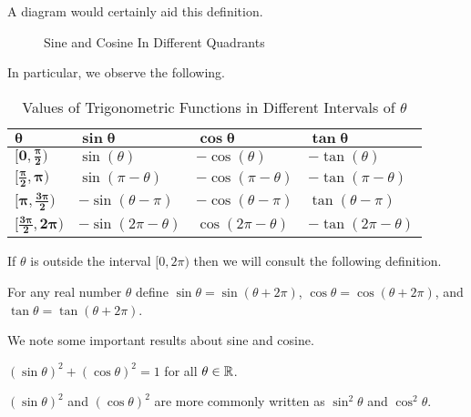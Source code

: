 A diagram would certainly aid this definition.

\begin{figure}[H]
    \centering
    \caption{Sine and Cosine In Different Quadrants}
\end{figure}

In particular, we observe the following.
\begin{table}[H]
    \centering
    \begin{tabular}{|l|l|l|l|}
        \hline
        $\boldsymbol{\theta}$ & $\boldsymbol{\sin\theta}$ & $\boldsymbol{\cos\theta}$ & $\boldsymbol{\tan\theta}$ \\ \hline
        $\boldsymbol{[0,\frac\pi2)}$ & $\sin(\theta)$ & $-\cos(\theta)$ & $-\tan(\theta)$ \\ \hline
        $\boldsymbol{[\frac\pi2, \pi)}$ & $\sin(\pi-\theta)$ & $-\cos(\pi-\theta)$ & $-\tan(\pi-\theta)$ \\ \hline
        $\boldsymbol{[\pi,\frac{3\pi}2)}$ & $-\sin(\theta-\pi)$ & $-\cos(\theta-\pi)$ & $\tan(\theta-\pi)$ \\ \hline
        $\boldsymbol{[\frac{3\pi}2, 2\pi)}$ & $-\sin(2\pi-\theta)$ & $\cos(2\pi-\theta)$ & $-\tan(2\pi-\theta)$ \\ \hline
    \end{tabular}
    \caption{Values of Trigonometric Functions in Different Intervals of $\theta$}
\end{table}

If $\theta$ is outside the interval $[0, 2\pi)$ then we will consult the following definition.

\begin{definition}
    For any real number $\theta$ define $\sin\theta = \sin(\theta + 2\pi)$, $\cos\theta = \cos(\theta + 2\pi)$, and $\tan\theta = \tan(\theta + 2\pi)$.
\end{definition}

We note some important results about sine and cosine.
\begin{theorem}
    $(\sin\theta)^2 + (\cos\theta)^2 = 1$ for all $\theta \in \mathbb{R}$.
\end{theorem}
\begin{remark}
    $(\sin\theta)^2$ and $(\cos\theta)^2$ are more commonly written as $\sin^2\theta$ and $\cos^2\theta$.
\end{remark}

